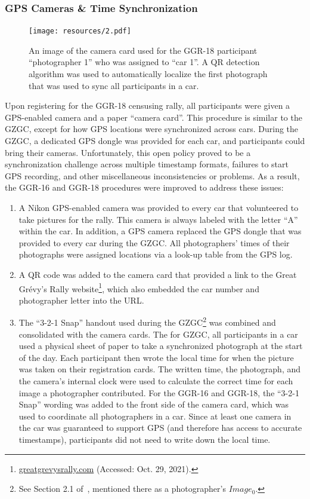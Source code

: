 \subsubsection{GPS Cameras \& Time Synchronization}

\begin{figure}[!t]
    \begin{center}
        \texttt{[image: resources/2.pdf]}
    \end{center}
    \caption{An image of the camera card used for the GGR-18 participant ``photographer 1'' who was assigned to ``car 1''.  A QR detection algorithm  was used to automatically localize the first photograph that was used to sync all participants in a car.}
    \label{fig:card}
\end{figure}

Upon registering for the GGR-18 censusing rally, all participants were given a GPS-enabled camera and a paper ``camera card''.  This procedure is similar to the GZGC, except for how GPS locations were synchronized across cars.  During the GZGC, a dedicated GPS dongle was provided for each car, and participants could bring their cameras. Unfortunately, this open policy proved to be a synchronization challenge across multiple timestamp formats, failures to start GPS recording, and other miscellaneous inconsistencies or problems. As a result, the GGR-16 and GGR-18 procedures were improved to address these issues:

\begin{enumerate}
    \item A Nikon GPS-enabled camera was provided to every car that volunteered to take pictures for the rally.  This camera is always labeled with the letter ``A'' within the car. In addition, a GPS camera replaced the GPS dongle that was provided to every car during the GZGC.  All photographers' times of their photographs were assigned locations via a look-up table from the GPS log.
    \item A QR code was added to the camera card that provided a link to the Great Gr\'evy's Rally website\footnote{\url{greatgrevysrally.com} (Accessed: Oct. 29, 2021).}, which also embedded the car number and photographer letter into the URL.
    \item The ``3-2-1 Snap'' handout used during the GZGC\footnote{See Section 2.1 of~\cite{parham_photographic_2015}, mentioned there as a photographer's $Image_0$.} was combined and consolidated with the camera cards.  The for GZGC, all participants in a car used a physical sheet of paper to take a synchronized photograph at the start of the day.  Each participant then wrote the local time for when the picture was taken on their registration cards.  The written time, the photograph, and the camera's internal clock were used to calculate the correct time for each image a photographer contributed.  For the GGR-16 and GGR-18, the ``3-2-1 Snap'' wording was added to the front side of the camera card, which was used to coordinate all photographers in a car.  Since at least one camera in the car was guaranteed to support GPS (and therefore has access to accurate timestamps), participants did not need to write down the local time.
\end{enumerate}

